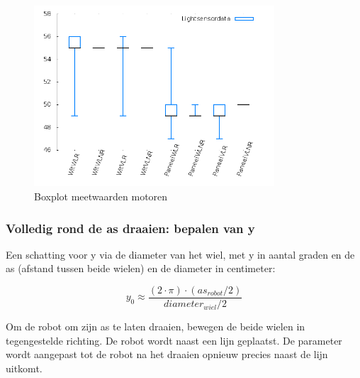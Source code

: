 \documentclass[tt3]{penoverslag}
\begin{document}
\begin{figure}[tbp]
\begin{center}
    \includegraphics[width=0.8\textwidth]{boxplotLichtSensor}
    \caption{Boxplot meetwaarden motoren}
    \label{fig:boxMot}
\end{center}
\end{figure}

\subsubsection{Volledig rond de as draaien: bepalen van y} %
\label{ssec:calibMy}

Een schatting voor y via de diameter van het wiel, met y in aantal graden en de as (afstand tussen beide wielen) en de diameter in centimeter:

\begin{equation*}
y_{0} \approx \frac{(2 \cdot \pi) \cdot (as_{robot}/2)}{diameter_{wiel}/2}
\end{equation*}

Om de robot om zijn as te laten draaien, bewegen de beide wielen in tegengestelde richting. De robot wordt naast een lijn geplaatst. De parameter wordt aangepast tot de robot na het draaien opnieuw precies naast de lijn uitkomt.
\end{document}
